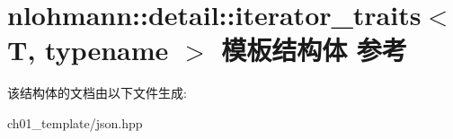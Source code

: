 \hypertarget{structnlohmann_1_1detail_1_1iterator__traits}{}\section{nlohmann\+::detail\+::iterator\+\_\+traits$<$ T, typename $>$ 模板结构体 参考}
\label{structnlohmann_1_1detail_1_1iterator__traits}


该结构体的文档由以下文件生成\+:\begin{DoxyCompactItemize}
\item 
ch01\+\_\+template/json.\+hpp\end{DoxyCompactItemize}
